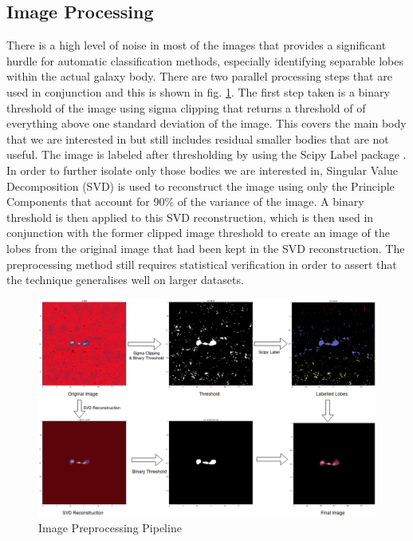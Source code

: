 \documentclass[conference]{IEEEtran}
\begin{document}
\subsection{Image Processing}
There is a high level of noise in most of the images that provides a significant hurdle for automatic classification methods, especially identifying separable lobes within the actual galaxy body. There are two parallel processing steps that are used in conjunction and this is shown in fig. \ref{fig:imagepipeline}. The first step taken is a binary threshold of the image using sigma clipping that returns a threshold of of everything above one standard deviation of the image. This covers the main body that we are interested in but still includes residual smaller bodies that are not useful. The image is labeled after thresholding by using the Scipy Label package \cite{scipy}. In order to further isolate only those bodies we are interested in, Singular Value Decomposition (SVD) is used to reconstruct the image using only the Principle Components that account for 90\% of the variance of the image. A binary threshold is then applied to this SVD reconstruction, which is then used in conjunction with the former clipped image threshold to create an image of the lobes from the original image that had been kept in the SVD reconstruction. The preprocessing method still requires statistical verification in order to assert that the technique generalises well on larger datasets. 

\begin{figure}[h]
    \centering
    \includegraphics[scale=0.5]{EPS/pipelines.eps}
    \caption{Image Preprocessing Pipeline}
    \label{fig:imagepipeline}
\end{figure}
\end{document}
